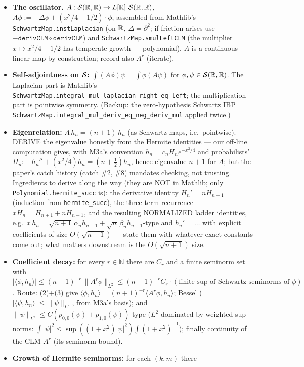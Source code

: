 \documentclass[11pt]{article}
\theoremstyle{plain}
\theoremstyle{remark}
\newcommand{\ip}[2]{\langle #1,#2\rangle}
\begin{document}
\begin{itemize}
\item[(1)] \textbf{The oscillator.} $A:\mathcal{S}(\mathbb{R},\mathbb{R})\to L[\mathbb{R}]\
\mathcal{S}(\mathbb{R},\mathbb{R})$, $A\phi:=-\Delta\phi+(x^2/4+1/2)\cdot\phi$, assembled from
Mathlib's \texttt{SchwartzMap.instLaplacian} (on $\mathbb{R}$, $\Delta=\partial^2$;
if friction arises use $-\texttt{derivCLM}\circ\texttt{derivCLM}$) and
\texttt{SchwartzMap.smulLeftCLM} (the multiplier $x\mapsto x^2/4+1/2$ has
temperate growth --- polynomial). $A$ is a continuous linear map by
construction; record also $A^r$ (iterate).
\item[(2)] \textbf{Self-adjointness on $\mathcal{S}$:}
$\int(A\phi)\psi=\int\phi(A\psi)$ for $\phi,\psi\in\mathcal{S}(\mathbb{R},\mathbb{R})$. The
Laplacian part is Mathlib's
\texttt{SchwartzMap.integral\_mul\_laplacian\_right\_eq\_left}; the
multiplication part is pointwise symmetry. (Backup: the zero-hypothesis
Schwartz IBP \texttt{SchwartzMap.integral\_mul\_deriv\_eq\_neg\_deriv\_mul}
applied twice.)
\item[(3)] \textbf{Eigenrelation:} $A\,h_n=(n+1)\,h_n$ (as Schwartz maps,
i.e.\ pointwise). DERIVE the eigenvalue honestly from the Hermite
identities --- our off-line computation gives, with M3a's convention
$h_n=c_nH_ne^{-x^2/4}$ and probabilists' $H_n$:
$-h_n''+(x^2/4)h_n=(n+\tfrac12)h_n$, hence eigenvalue $n+1$ for $A$; but
the paper's catch history (catch \#2, \#8) mandates checking, not
trusting. Ingredients to derive along the way (they are NOT in Mathlib;
only \texttt{Polynomial.hermite\_succ} is): the derivative identity
$H_n'=nH_{n-1}$ (induction from \texttt{hermite\_succ}), the three-term
recurrence $xH_n=H_{n+1}+nH_{n-1}$, and the resulting NORMALIZED ladder
identities, e.g.\ $x\,h_n=\sqrt{n+1}\,\alpha_{n}h_{n+1}+\sqrt n\,
\beta_nh_{n-1}$-type and $h_n'=\dots$ with explicit coefficients of size
$O(\sqrt{n+1})$ --- state them with whatever exact constants come out;
what matters downstream is the $O(\sqrt{n+1})$ size.
\item[(4)] \textbf{Coefficient decay:} for every $r\in\mathbb N$ there
are $C_r$ and a finite seminorm set with
$|\ip{\phi}{h_n}|\le(n+1)^{-r}\,\|A^r\phi\|_{L^2}\le(n+1)^{-r}C_r\cdot
(\text{finite sup of Schwartz seminorms of }\phi)$. Route: (2)+(3) give
$\ip{\phi}{h_n}=(n+1)^{-r}\ip{A^r\phi}{h_n}$; Bessel
($|\ip{\psi}{h_n}|\le\|\psi\|_{L^2}$, from M3a's basis); and
$\|\psi\|_{L^2}\le C(p_{0,0}(\psi)+p_{1,0}(\psi))$-type ($L^2$ dominated
by weighted sup norms: $\int|\psi|^2\le\sup((1+x^2)|\psi|^2)\int
(1+x^2)^{-1}$); finally continuity of the CLM $A^r$ (its seminorm bound).
\item[(5)] \textbf{Growth of Hermite seminorms:} for each $(k,m)$ there

\end{itemize}
\end{document}
